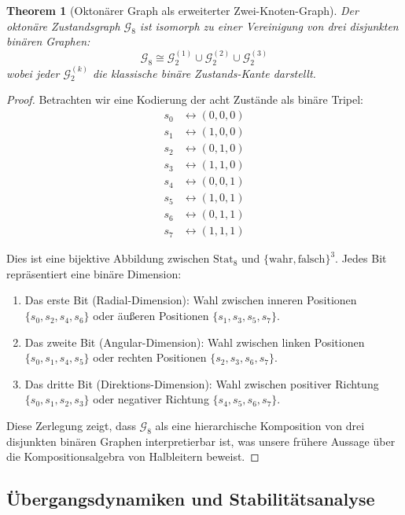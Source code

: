 \documentclass[12pt, a4paper]{article}
\newtheorem{theorem}{Theorem}[section]
\theoremstyle{definition}
\theoremstyle{remark}
\newcommand{\Bool}{\{\mathrm{wahr}, \mathrm{falsch}\}}
\newcommand{\Graph}{\mathcal{G}}
\newcommand{\Stat}{\mathrm{Stat}}
\begin{document}
\begin{theorem}[Oktonärer Graph als erweiterter Zwei-Knoten-Graph]
\label{thm:oktonaerer_als_erweiterter_zweiknoten}
Der oktonäre Zustandsgraph $\Graph_8$ ist isomorph zu einer Vereinigung von drei disjunkten binären Graphen:
\[
\Graph_8 \cong \Graph_2^{(1)} \cup \Graph_2^{(2)} \cup \Graph_2^{(3)}
\]
wobei jeder $\Graph_2^{(k)}$ die klassische binäre Zustands-Kante darstellt.
\end{theorem}

\begin{proof}
Betrachten wir eine Kodierung der acht Zustände als binäre Tripel:
\[
\begin{aligned}
s_0 &\leftrightarrow (0,0,0) \\
s_1 &\leftrightarrow (1,0,0) \\
s_2 &\leftrightarrow (0,1,0) \\
s_3 &\leftrightarrow (1,1,0) \\
s_4 &\leftrightarrow (0,0,1) \\
s_5 &\leftrightarrow (1,0,1) \\
s_6 &\leftrightarrow (0,1,1) \\
s_7 &\leftrightarrow (1,1,1)
\end{aligned}
\]

Dies ist eine bijektive Abbildung zwischen $\Stat_8$ und $\Bool^3$. Jedes Bit repräsentiert eine binäre Dimension:
\begin{enumerate}[label=(\roman*)]
  \item Das erste Bit (Radial-Dimension): Wahl zwischen inneren Positionen $\{s_0, s_2, s_4, s_6\}$ oder äußeren Positionen $\{s_1, s_3, s_5, s_7\}$.
  \item Das zweite Bit (Angular-Dimension): Wahl zwischen linken Positionen $\{s_0, s_1, s_4, s_5\}$ oder rechten Positionen $\{s_2, s_3, s_6, s_7\}$.
  \item Das dritte Bit (Direktions-Dimension): Wahl zwischen positiver Richtung $\{s_0, s_1, s_2, s_3\}$ oder negativer Richtung $\{s_4, s_5, s_6, s_7\}$.
\end{enumerate}

Diese Zerlegung zeigt, dass $\Graph_8$ als eine hierarchische Komposition von drei disjunkten binären Graphen interpretierbar ist, was unsere frühere Aussage über die Kompositionsalgebra von Halbleitern beweist.
\end{proof}

\subsection{Übergangsdynamiken und Stabilitätsanalyse}
\label{subsec:uebergangsdynamiken}
\end{document}
